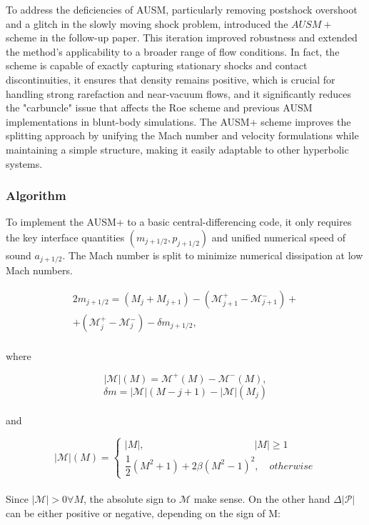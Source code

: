 \documentclass[a5paper]{sapthesis}
\begin{document}
	To address the deficiencies of AUSM, particularly removing postshock overshoot and a glitch in the slowly moving shock problem, \citet{LIOU_AUSM+} introduced the $AUSM+$ scheme in the follow-up paper. This iteration improved robustness and extended the method’s applicability to a broader range of flow conditions. In fact, the scheme is capable of exactly capturing stationary shocks and contact discontinuities, it ensures that density remains positive, which is crucial for handling strong rarefaction and near-vacuum flows, and it significantly reduces the "carbuncle" issue that affects the Roe scheme and previous AUSM implementations in blunt-body simulations.
	The AUSM+ scheme improves the splitting approach by unifying the Mach number and velocity formulations while maintaining a simple structure, making it easily adaptable to other hyperbolic systems.  
	
	\subsubsection*{Algorithm}
	To implement the AUSM+ to a basic central-differencing code, it only requires the key interface quantities $(m_{j+1/2},p_{j+1/2})$ and unified numerical speed of sound $a_{j+1/2}$.  
	The Mach number is split to minimize numerical dissipation at low Mach numbers.
	
	\begin{equation}
		\begin{aligned}
			2m_{j+1/2} = (M_j +M_{j+1})-(\mathscr{M}_{j+1}^+ - \mathscr{M}_{j+1}^-)+\\
			+(\mathscr{M}_{j}^+ - \mathscr{M}_{j}^-)-\delta m_{j+1/2},
		\end{aligned}
	\end{equation}
	\\
	where
	
	\begin{equation}
		|\mathscr{M}|(M)= \mathscr{M}^+(M)-\mathscr{M}^-(M), 
	\end{equation}
	\begin{equation}
		\delta m = |\mathscr{M}|(M-{j+1})-|\mathscr{M}|(M_j) 
	\end{equation}
	\\
	and
	
	\begin{equation}
		|\mathscr{M}|(M) = 
		\begin{cases}
			|M|,\qquad \qquad \qquad \qquad \qquad \quad |M|\geq1\\
			\dfrac{1}{2}(M^2 +1)+2\beta(M^2-1)^2,\quad otherwise
		\end{cases}
	\end{equation}
	\\
	Since $|\mathscr{M}| >0 \forall M$, the absolute sign to $\mathscr{M}$ make sense. On the other hand $\Delta |\mathscr{P}|$ can be either positive or negative, depending on the sign of M:
	
\end{document}
